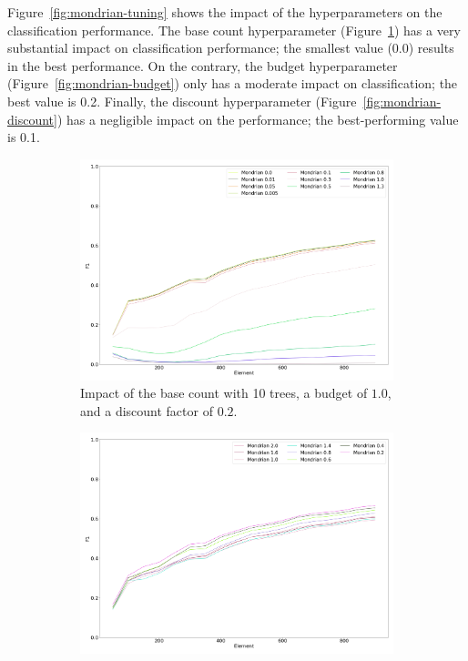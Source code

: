 Figure~\ref{fig:mondrian-tuning} shows the impact of the \mondrianforest hyperparameters on
the classification performance. 
The base count hyperparameter (Figure~\ref{fig:mondrian-base-count}) has a
very substantial impact on classification performance; the smallest value
(0.0) results in the best performance. On the contrary, the
budget hyperparameter (Figure~\ref{fig:mondrian-budget}) only has a
moderate impact on classification; the best value is 0.2. Finally, the discount hyperparameter
(Figure~\ref{fig:mondrian-discount}) has a negligible impact on the
performance; the best-performing value is 0.1.

\begin{figure}
	 \centering
	 \begin{subfigure}[b]{0.49\textwidth}
		\centering
		\includegraphics[width=\textwidth]{figures/calibration_mondrian_base.png}
		\caption{Impact of the base count with 10 trees, a budget of $1.0$, and a discount factor of $0.2$.} 
		\label{fig:mondrian-base-count}
	\end{subfigure}
	\hfill
	 \begin{subfigure}[b]{0.49\textwidth}
		 \centering
		 \includegraphics[width=\textwidth]{figures/calibration_mondrian_lifetime.png}

\end{subfigure}
\end{figure}
